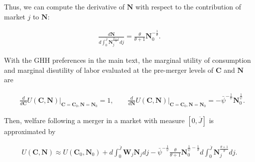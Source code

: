 \documentclass[12pt]{article}
\theoremstyle{prop}
\begin{document}
Thus, we can compute the derivative of $\mathbf{N}$ with respect to the contribution of market $j$ to $\mathbf{N}$: 
\begin{footnotesize}
\begin{equation*}
\begin{aligned}
\frac{d\mathbf{N}}{d\int_{0}^{\overline{J}}\mathbf{N}_{j}^{\frac{\theta+1}{\theta}}dj} = \frac{\theta}{\theta+1} \mathbf{N}_{0}^{-\frac{1}{\theta}}.
\end{aligned}
\end{equation*}
\end{footnotesize}
With the GHH preferences in the main text, the marginal utility of consumption and marginal disutility of labor evaluated at the pre-merger levels of $\mathbf{C}$ and $\mathbf{N}$ are 
\begin{footnotesize}
\begin{equation*}
\begin{aligned}
    &\frac{d}{d\mathbf{C}} U(\mathbf{C}, \mathbf{N})\Big|_{\mathbf{C}=\mathbf{C}_{0},\mathbf{N}=\mathbf{N}_{0}} = 1, \qquad \frac{d}{d\mathbf{N}} U(\mathbf{C}, \mathbf{N})\Big|_{\mathbf{C}=\mathbf{C}_{0},\mathbf{N}=\mathbf{N}_{0}} = -\bar{\psi}^{-\frac{1}{\psi}} \mathbf{N}_0^{\frac{1}{\psi}}.
\end{aligned}
\end{equation*}
\end{footnotesize}
Then, welfare following a merger in a market with measure $[0,\overline{J}]$ is approximated by
\begin{footnotesize}
\begin{equation}
\begin{aligned}
\label{eq:welfare}
U\left(\mathbf{C},\mathbf{N}\right) \approx U\left(\mathbf{C}_{0},\mathbf{N}_{0}\right)+ d\int_{0}^{\overline{J}}\mathbf{W}_{j}\mathbf{N}_{j}dj
-\bar{\psi}^{-\frac{1}{\psi}} \frac{\theta}{\theta+1} \mathbf{N}_0^{\frac{1}{\psi} - \frac{1}{\theta}}d\int_{0}^{\overline{J}} \mathbf{N}_{j}^{\frac{\theta+1}{\theta}}dj.
\end{aligned}
\end{equation}
\end{footnotesize}
\end{document}
